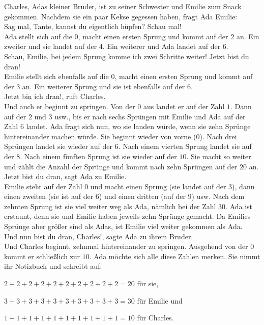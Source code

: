 Charles, Adas kleiner Bruder, ist zu seiner Schwester und Emilie zum Snack gekommen. Nachdem sie ein paar Kekse gegessen haben, fragt Ada Emilie: \\
\frqq{}Sag mal, Tante, kannst du eigentlich hüpfen? Schau mal!\flqq{}\\
Ada stellt sich auf die $0$, macht einen ersten Sprung und kommt auf der $2$ an. Ein zweiter und sie landet auf der $4$. Ein weiterer und Ada landet auf der $6$.\\
\frqq{}Schau, Emilie, bei jedem Sprung komme ich zwei Schritte weiter! Jetzt bist du dran!\flqq{}\\
Emilie stellt sich ebenfalls auf die $0$, macht einen ersten Sprung und kommt auf der $3$ an. Ein weiterer Sprung und sie ist ebenfalls auf der $6$.\\
\frqq{}Jetzt bin ich dran!\flqq{}, ruft Charles.\\
Und auch er beginnt zu springen. Von der $0$ aus landet er auf der Zahl $1$. Dann auf der $2$ und $3$ usw., bis er nach sechs Sprüngen mit Emilie und Ada auf der Zahl $6$ landet.
Ada fragt sich nun, wo sie landen würde, wenn sie zehn Sprünge hintereinander machen würde. 
Sie beginnt wieder von vorne ($0$). Nach drei Sprüngen landet sie wieder auf der $6$. 
Nach einem vierten Sprung landet sie auf der $8$. 
Nach einem fünften Sprung ist sie wieder auf der $10$. Sie macht so weiter und zählt die Anzahl der Sprünge und kommt nach zehn Sprüngen auf der $20$ an. \\
\frqq{}Jetzt bist du dran\flqq{}, sagt Ada zu Emilie.\\
Emilie steht auf der Zahl $0$ und macht einen Sprung (sie landet auf der $3$), dann einen zweiten (sie ist auf der $6$) und einen dritten (auf der $9$) usw. Nach dem zehnten Sprung ist sie viel weiter weg als Ada, nämlich bei der Zahl $30$.
Ada ist erstaunt, denn sie und Emilie haben jeweils zehn Sprünge gemacht. Da Emilies Sprünge aber größer sind als Adas, ist Emilie viel weiter gekommen als Ada.\\ 
\frqq{}Und nun bist du dran, Charles!\flqq{}, sagte Ada zu ihrem Bruder.\\
Und Charles beginnt, zehnmal hintereinander zu springen. Ausgehend von der $0$ kommt er schließlich zur $10$.
Ada möchte sich alle diese Zahlen merken. Sie nimmt ihr Notizbuch und schreibt auf:
\begin{description}[leftmargin=0.5cm]
    \item $2+2+2+2+2+2+2+2+2+2=20$ für sie,
    \item $3+3+3+3+3+3+3+3+3+3=30$ für Emilie und
    \item $1+1+1+1+1+1+1+1+1+1=10$ für Charles.
\end{description}
